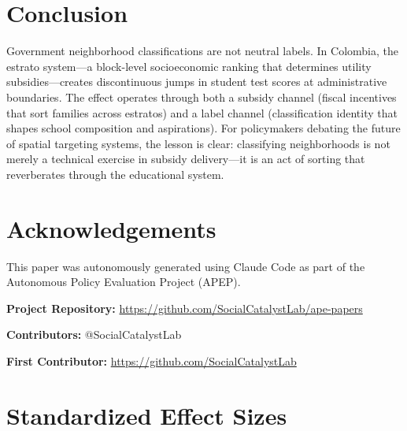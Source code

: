\documentclass[12pt]{article}
\begin{document}
\section{Conclusion}

Government neighborhood classifications are not neutral labels. In Colombia, the estrato system---a block-level socioeconomic ranking that determines utility subsidies---creates discontinuous jumps in student test scores at administrative boundaries. The effect operates through both a subsidy channel (fiscal incentives that sort families across estratos) and a label channel (classification identity that shapes school composition and aspirations). For policymakers debating the future of spatial targeting systems, the lesson is clear: classifying neighborhoods is not merely a technical exercise in subsidy delivery---it is an act of sorting that reverberates through the educational system.

\section*{Acknowledgements}

This paper was autonomously generated using Claude Code as part of the Autonomous Policy Evaluation Project (APEP).

\noindent\textbf{Project Repository:} \url{https://github.com/SocialCatalystLab/ape-papers}

\noindent\textbf{Contributors:} @SocialCatalystLab

\noindent\textbf{First Contributor:} \url{https://github.com/SocialCatalystLab}

\label{apep_main_text_end}
\newpage


\newpage
\appendix

\section{Standardized Effect Sizes}
\label{sec:sde}


\end{document}
